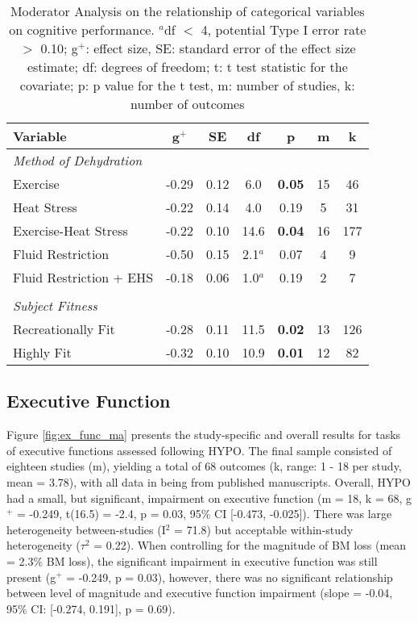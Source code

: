 \begin{table}
	\caption{Moderator Analysis on the relationship of categorical variables on cognitive performance. ${^a}$df ${<}$ 4, potential Type I error rate ${>}$ 0.10; g${^+}$: effect size, SE: standard error of the effect size estimate; df: degrees of freedom; t: t test statistic for the covariate; p: p value for the t test, m: number of studies, k: number of outcomes}
	\centering
	
	\begin{tabular}{lcccccc} 
		\hline
		\textbf{Variable} & \textbf{g${^+}$} & \textbf{SE} & \textbf{df} & \textbf{p} & \textbf{m} & 
		\textbf{k} \\
		\hline
		\textit{Method of Dehydration} &&&&&& \\
		Exercise & -0.29 & 0.12 & 6.0 & \textbf{0.05} & 15 & 46 \\
		Heat Stress & -0.22 & 0.14 & 4.0 & 0.19 & 5 & 31 \\
		Exercise-Heat Stress & -0.22 & 0.10 & 14.6 & \textbf{0.04} & 16 & 177 \\
		Fluid Restriction & -0.50 & 0.15 & 2.1${^a}$ & 0.07 & 4 & 9 \\
		Fluid Restriction + EHS	& -0.18 & 0.06 & 1.0${^a}$ & 0.19 & 2 & 7 \\
		&&&&&& \\
		\textit{Subject Fitness} &&&&&& \\
		Recreationally Fit & -0.28 & 0.11 & 11.5 & \textbf{0.02} & 13 & 126 \\
		Highly Fit &  -0.32 & 0.10 & 10.9 & \textbf{0.01} & 12 & 82 \\ 
		\hline	    
	\end{tabular}
	\label{tbl:moderators}
\end{table}

\subsection{Executive Function}
Figure \ref{fig:ex_func_ma} presents the study-specific and overall results for tasks of executive functions assessed following HYPO. The final sample consisted of eighteen studies (m), yielding a total of 68 outcomes (k, range: 1 - 18 per study, mean = 3.78), with all data in being from published manuscripts. Overall, HYPO had a small, but significant, impairment on executive function (m = 18, k = 68, g${^+}$ =  -0.249, t(16.5) = -2.4, p = 0.03, 95\% CI [-0.473, -0.025]). There was large heterogeneity between-studies (I${^2}$ = 71.8) but acceptable within-study heterogeneity (${\tau}$${^2}$ = 0.22). When controlling for the magnitude of BM loss (mean = 2.3\% BM loss), the significant impairment in executive function was still present (g${^+}$ =  -0.249, p = 0.03), however, there was no significant relationship between level of magnitude and executive function impairment (slope = -0.04, 95\% CI: [-0.274, 0.191], p = 0.69). 

